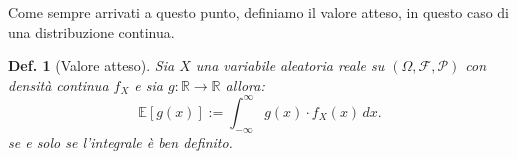 \documentclass{article}
\newtheorem{definition}{Def.}[section]
\begin{document}
Come sempre arrivati a questo punto, definiamo il valore atteso, in questo caso
di una distribuzione continua.
\begin{definition}[Valore atteso]
	Sia $X$ una variabile aleatoria reale su $(\Omega, \mathcal{F, P})$ con
	densità continua $f_X$ e sia $g: \mathbb{R} \to \mathbb{R}$ allora:
	\begin{equation*}
		\mathbb{E}[g(x)] := \int_{-\infty}^{\infty} g(x) \cdot f_X(x) \, dx.
	\end{equation*}
	se e solo se l'integrale è ben definito.
\end{definition}
\end{document}
